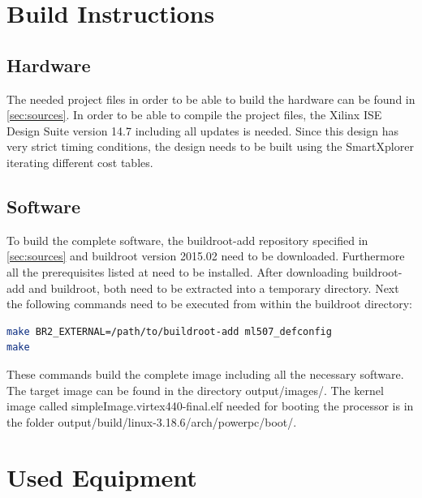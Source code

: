 \documentclass[12pt,a4paper,parskip=full,abstract=true,BCOR=12mm,twoside,open=right]{scrreprt}
\begin{document}
\chapter{Build Instructions}
\section{Hardware}
\label{sec:build:hw}

The needed project files in order to be able to build the hardware can be found
in \cref{sec:sources}. In order to be able to compile the project files, the
Xilinx ISE Design Suite version 14.7 including all updates is needed. Since
this design has very strict timing conditions, the design needs to be built
using the SmartXplorer iterating different cost tables.

\section{Software}
\label{sec:build:sw}

To build the complete software, the buildroot-add repository specified in
\cref{sec:sources} and buildroot version 2015.02 \cite{buildroot} need to be downloaded. Furthermore
all the prerequisites listed at \cite{buildroot} need to be installed. After
downloading buildroot-add and buildroot, both need to be extracted into a temporary directory. Next
the following commands need to be executed from within the buildroot directory:

\begin{lstlisting}[language=sh]
make BR2_EXTERNAL=/path/to/buildroot-add ml507_defconfig
make
\end{lstlisting}

These commands build the complete image including all the necessary software. The target image
can be found in the directory {\ttfamily output/images/}. The kernel image called {\ttfamily simpleImage.virtex440-final.elf} needed for booting
the processor is in the folder {\ttfamily output/build/linux-3.18.6/arch/powerpc/boot/}.

\chapter{Used Equipment}
\label{sec:instruments}
\end{document}
